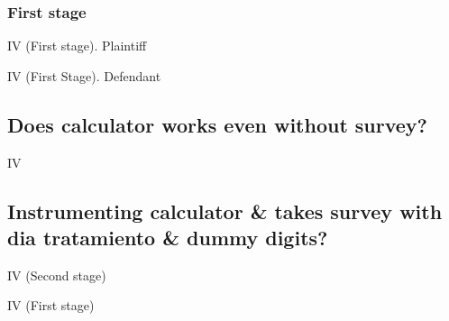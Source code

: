 \documentclass[12pt]{article}
\theoremstyle{named}
\newcommand{\folder}{./Effect}
\begin{document}
\subsubsection*{First stage}


\begin{table}[H]\centering \caption{IV (First stage). Plaintiff}
\begin{center}
\scriptsize{}
\end{center}
\end{table}
\begin{table}[H]\centering \caption{IV (First Stage). Defendant}
\begin{center}
\scriptsize{}
\end{center}
\end{table}

\pagebreak

\subsection*{Does calculator works even without survey?}

\begin{table}[H]\centering \caption{IV}
\begin{center}
\scriptsize{}
\end{center}
\end{table}


\pagebreak

\subsection*{Instrumenting calculator \& takes survey with dia tratamiento \& dummy digits?}

\begin{table}[H]\centering \caption{IV (Second stage)}
\begin{center}
\scriptsize{}
\end{center}
\end{table}

\pagebreak

\begin{table}[H]\centering \caption{IV (First stage)}
\begin{center}
\scriptsize{}
\end{center}
\end{table}
\end{document}
